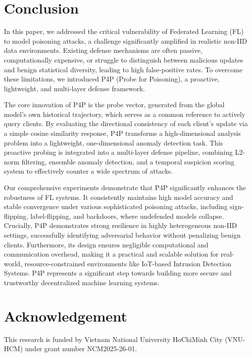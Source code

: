 \section{Conclusion} 
\label{sec_conclusion}

In this paper, we addressed the critical vulnerability of Federated Learning (FL) to model poisoning attacks, a challenge significantly amplified in realistic non-IID data environments. Existing defense mechanisms are often passive, computationally expensive, or struggle to distinguish between malicious updates and benign statistical diversity, leading to high false-positive rates. To overcome these limitations, we introduced P4P (Probe for Poisoning), a proactive, lightweight, and multi-layer defense framework.

The core innovation of P4P is the probe vector, generated from the global model's own historical trajectory, which serves as a common reference to actively query clients. By evaluating the directional consistency of each client's update via a simple cosine similarity response, P4P transforms a high-dimensional analysis problem into a lightweight, one-dimensional anomaly detection task. This proactive probing is integrated into a multi-layer defense pipeline, combining L2-norm filtering, ensemble anomaly detection, and a temporal suspicion scoring system to effectively counter a wide spectrum of attacks.

Our comprehensive experiments demonstrate that P4P significantly enhances the robustness of FL systems. It consistently maintains high model accuracy and stable convergence under various sophisticated poisoning attacks, including sign-flipping, label-flipping, and backdoors, where undefended models collapse. Crucially, P4P demonstrates strong resilience in highly heterogeneous non-IID settings, successfully identifying adversarial behavior without penalizing benign clients. Furthermore, its design ensures negligible computational and communication overhead, making it a practical and scalable solution for real-world, resource-constrained environments like IoT-based Intrusion Detection Systems. P4P represents a significant step towards building more secure and trustworthy decentralized machine learning systems.

\section*{Acknowledgement}

This research is funded by Vietnam National University HoChiMinh City (VNU-HCM) under grant number NCM2025-26-01.

